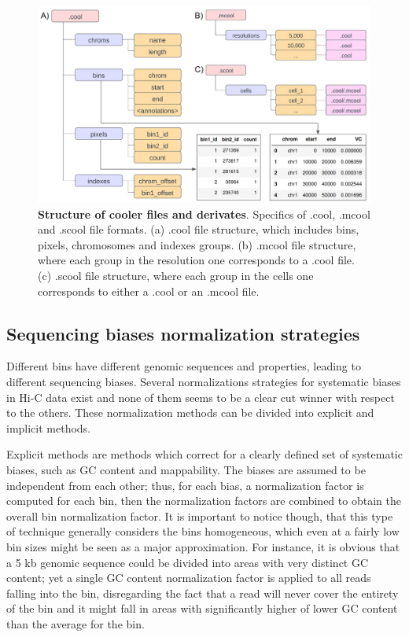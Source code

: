 \begin{figure}
  \centering
  \includegraphics[width=1\textwidth]{cooler_format.png}
  \caption{\textbf{Structure of cooler files and derivates}. Specifics of .cool, .mcool and .scool file formats. (a) .cool file structure, which includes bins, pixels, chromosomes and indexes groups. (b) .mcool file structure, where each group in the resolution one corresponds to a .cool file. (c) .scool file structure, where each group in the cells one corresponds to either a .cool or an .mcool file.}
  \label{fig:cooler}
\end{figure}

\subsection{Sequencing biases normalization strategies}

Different bins have different genomic sequences and properties, leading to different sequencing biases. Several normalizations strategies for systematic biases in Hi-C data exist and none of them seems to be a clear cut winner with respect to the others\cite{normalization2020}. These normalization methods can be divided into explicit and implicit methods. 

Explicit methods are methods which correct for a clearly defined set of systematic biases, such as GC content and mappability. The biases are assumed to be independent from each other; thus, for each bias, a normalization factor is computed for each bin, then the normalization factors are combined to obtain the overall bin normalization factor. It is important to notice though, that this type of technique generally considers the bins homogeneous, which even at a fairly low bin sizes might be seen as a major approximation. For instance, it is obvious that a 5 kb genomic sequence could be divided into areas with very distinct GC content; yet a single GC content normalization factor is applied to all reads falling into the bin, disregarding the fact that a read will never cover the entirety of the bin and it might fall in areas with significantly higher of lower GC content than the average for the bin.

